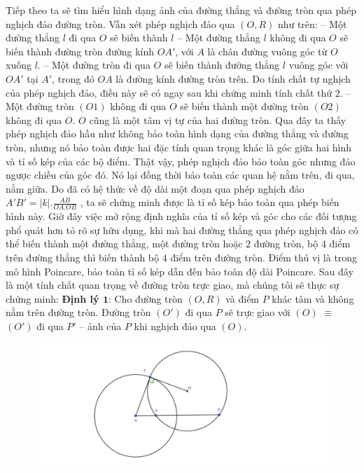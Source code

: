 \begin{multicols}{2}
\begin{figure}[H]
		\vspace*{-10pt}
	\end{figure}
	Tiếp theo ta sẽ tìm hiểu hình dạng ảnh của đường thẳng và đường tròn qua phép nghịch đảo đường tròn. Vẫn xét phép nghịch đảo qua $(O, R)$ như trên: 
	\vskip 0.1cm
	-- Một đường thẳng $l$ đi qua $O$ sẽ biến thành $l$
	\vskip 0.1cm
	-- Một đường thẳng $l$ không đi qua $O$ sẽ biến thành  đường tròn đường kính $OA'$, với $A$ là chân đường vuông góc từ $O$ xuống $l$.
	\vskip 0.1cm 
	-- Một đường tròn đi qua $O$ sẽ biến thành đường thẳng $l$ vuông góc với $OA'$ tại $A'$, trong đó $OA$ là đường kính đường tròn trên. Do tính chất tự nghịch của phép nghịch đảo, điều này sẽ có ngay sau khi chứng minh tính chất thứ $2$. 
	\vskip 0.1cm
	-- Một đường tròn $(O1)$ không đi qua $O$ sẽ biến thành một đường tròn $(O2)$ không đi qua $O$. $O$ cũng là một tâm vị tự của hai đường tròn. 
	\vskip 0.1cm
	Qua đây ta thấy phép nghịch đảo hầu như không bảo toàn hình dạng của đường thẳng và đường tròn, nhưng nó bảo toàn được hai đặc tính quan trọng khác là góc giữa hai hình và tỉ số kép của các bộ điểm. Thật vậy, phép nghịch đảo bảo toàn góc nhưng đảo ngược chiều của góc đó. Nó lại đồng thời bảo toàn các quan hệ nằm trên, đi qua, nằm giữa. Do đã có hệ thức về độ dài một đoạn qua phép nghịch đảo  $A'B' = |k|. \frac{AB}{OA.OB}$ , ta sẽ chứng minh được là tỉ số kép bảo toàn qua phép biến hình này. Giờ đây việc mở rộng định nghĩa của tỉ số kép và góc cho các đối tượng phổ quát hơn tỏ rõ sự hữu dụng, khi mà hai đường thẳng qua phép nghịch đảo có thể biến thành một đường thẳng, một đường tròn hoặc $2$ đường tròn, bộ $4$ điểm trên đường thẳng thì biến thành bộ $4$ điểm trên đường tròn. Điểm thú vị là trong mô hình Poincare, bảo toàn tỉ số kép dẫn đến bảo toàn độ dài Poincare.
	\vskip 0.1cm
	Sau đây là một tính chất quan trọng về đường tròn trực giao, mà chúng tôi sẽ thực sự chứng minh:
	\vskip 0.1cm
	\textbf{\color{lichsutoanhoc}Định lý $\pmb{1}$}: Cho đường tròn $(O, R)$ và điểm $P$ khác tâm và không nằm trên đường tròn. Đường tròn $(O')$ đi qua $P$ sẽ trực giao với $(O)$ $ \equiv$ $(O')$ đi qua $P'$ -- ảnh của $P$ khi nghịch đảo qua $(O)$.
	\begin{figure}[H]
		\vspace*{-5pt}
		\centering
		\captionsetup{labelformat= empty, justification=centering}
		\includegraphics[width= 1\linewidth]{Định lý 1.pdf}

\end{figure}
\end{multicols}
